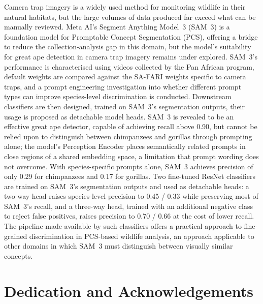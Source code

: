 \documentclass[author={Jacob Stephenson},
    degree={BSc},
    title={Robust Great Ape Species Detection in Wild Camera Trap Imagery with Promptable Concept Segmentation},
    unit={COMS30045},
    subtitle={}]{dissertation}
\begin{document}
Camera trap imagery is a widely used method for monitoring wildlife in their natural habitats, but the large volumes of data produced far exceed what can be manually reviewed. Meta AI's Segment Anything Model~3 (SAM~3) is a foundation model for Promptable Concept Segmentation (PCS), offering a bridge to reduce the collection-analysis gap in this domain, but the model's suitability for great ape detection in camera trap imagery remains under explored. SAM~3's performance is characterised using videos collected by the Pan African program, default weights are compared against the SA-FARI weights specific to camera traps, and a prompt engineering investigation into whether different prompt types can improve species-level discrimination is conducted. Downstream classifiers are then designed, trained on SAM~3's segmentation outputs, their usage is proposed as detachable model heads. SAM~3 is revealed to be an effective great ape detector, capable of achieving recall above 0.90, but cannot be relied upon to distinguish between chimpanzees and gorillas through prompting alone; the model's Perception Encoder places semantically related prompts in close regions of a shared embedding space, a limitation that prompt wording does not overcome. With species-specific prompts alone, SAM~3 achieves precision of only 0.29 for chimpanzees and 0.17 for gorillas. Two fine-tuned ResNet classifiers are trained on SAM~3's segmentation outputs and used as detachable heads: a two-way head raises species-level precision to 0.45 / 0.33 while preserving most of SAM~3's recall, and a three-way head, trained with an additional negative class to reject false positives, raises precision to 0.70 / 0.66 at the cost of lower recall. The pipeline made available by such classifiers offers a practical approach to fine-grained discrimination in PCS-based wildlife analysis, an approach applicable to other domains in which SAM~3 must distinguish between visually similar concepts.


\bigskip






\chapter*{Dedication and Acknowledgements}
\end{document}
